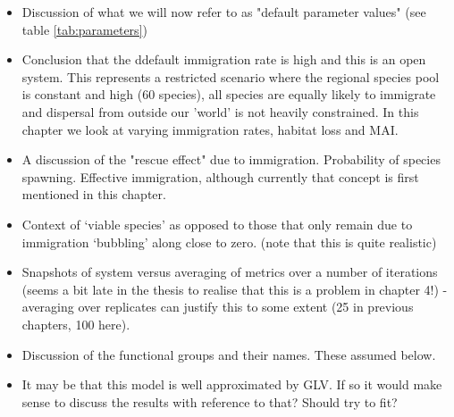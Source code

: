 \begin{itemize}

	\item Discussion of what we will now refer to as "default parameter values" (see table \ref{tab:parameters})
	\item Conclusion that the ddefault immigration rate is high and this is an open system. This represents a restricted scenario where the regional species pool is constant and high (60 species), all species are equally likely to immigrate and dispersal from outside our 'world' is not heavily constrained. In this chapter we look at varying immigration rates, habitat loss and MAI.
	\item A discussion of the "rescue effect" due to immigration. Probability of species spawning. Effective immigration, although currently that concept is first mentioned in this chapter.
	\item Context of `viable species' as opposed to those that only remain due to immigration `bubbling' along close to zero. (note that this is quite realistic)
	\item Snapshots of system versus averaging of metrics over a number of iterations (seems a bit late in the thesis to realise that this is a problem in chapter 4!) - averaging over replicates can justify this to some extent (25 in previous chapters, 100 here).
	
	\item Discussion of the functional groups and their names. These assumed below.

	\item It may be that this model is well approximated by GLV. If so it would make sense to discuss the results with reference to that? Should try to fit?
	
\cite{ripple2012trophic}




\end{itemize}
